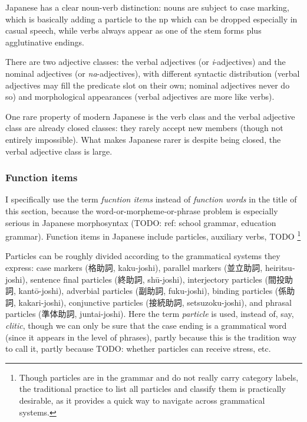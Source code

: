\documentclass[UTF8, a4paper, oneside, scheme=plain]{ctexart}
\newcommand*{\term}[1]{\emph{#1}}
\newcommand{\corpus}[1]{\emph{#1}}
\begin{document}
Japanese has a clear noun-verb distinction:
nouns are subject to case marking,
which is basically adding a particle to the \acs{np} 
which can be dropped especially in casual speech,
while verbs always appear as one of the stem forms plus agglutinative endings.

There are two adjective classes:
the verbal adjectives (or \corpus{i}-adjectives)
and the nominal adjectives (or \corpus{na}-adjectives),
with different syntactic distribution 
(verbal adjectives may fill the predicate slot on their own; nominal adjectives never do so)
and morphological appearances
(verbal adjectives are more like verbs).

One rare property of modern Japanese is the verb class and the verbal adjective class 
are already closed classes:
they rarely accept new members (though not entirely impossible).
What makes Japanese rarer is despite being closed,
the verbal adjective class is large.

\subsubsection{Function items}

I specifically use the term \term{fucntion items} instead of \term{function words}
in the title of this section,
because the word-or-morpheme-or-phrase problem is especially serious in Japanese morphosyntax
(TODO: ref: school grammar, education grammar).
Function items in Japanese include particles, auxiliary verbs, TODO %
\footnote{
    Though particles are in the grammar and do not really carry category labels,
    the traditional practice to list all particles and classify them 
    is practically desirable, 
    as it provides a quick way to navigate across grammatical systems.
}

Particles can be roughly divided according to the grammatical systems they express:
case markers (格助詞, kaku-joshi),
parallel markers (並立助詞, heiritsu-joshi),
sentence final particles (終助詞, shū-joshi),
interjectory particles (間投助詞, kantō-joshi),
adverbial particles (副助詞, fuku-joshi),
binding particles (係助詞, kakari-joshi),
conjunctive particles (接続助詞, setsuzoku-joshi),
and phrasal particles (準体助詞, juntai-joshi).
Here the term \term{particle} is used,
instead of, say, \term{clitic},
though we can only be sure that the case ending is a grammatical word 
(since it appears in the level of phrases),
partly because this is the tradition way to call it,
partly because TODO: whether particles can receive stress, etc.
\end{document}
